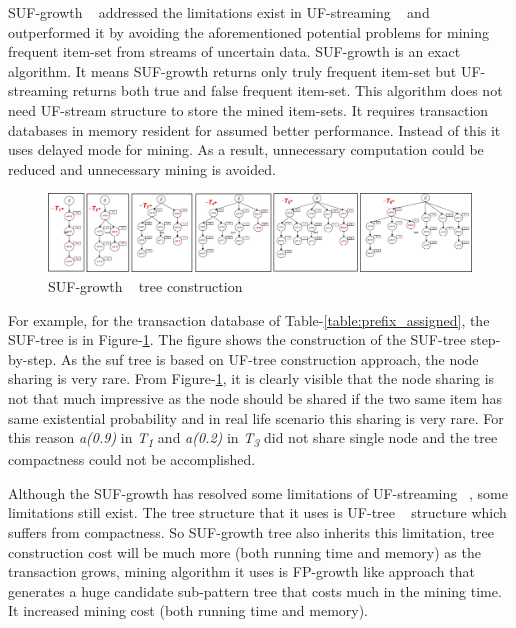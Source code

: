 \documentclass[conference]{IEEEtran}
\begin{document}
SUF-growth ~\cite{DBLP:conf/icde/LeungH09} addressed the limitations exist in UF-streaming ~\cite{DBLP:conf/icde/LeungH09} and outperformed it by avoiding the aforementioned potential problems for mining frequent item-set from streams of uncertain data. SUF-growth is an exact algorithm. It means SUF-growth returns only truly frequent item-set but UF-streaming returns both true and false frequent item-set. This algorithm does not need UF-stream structure to store the mined item-sets. It requires transaction databases in memory resident for assumed better performance. Instead of this it uses delayed mode for mining. As a result, unnecessary computation could be reduced and unnecessary mining is avoided.

        \begin{figure}[tb]
        \centering
            \includegraphics[width=\textwidth]{visio/SUF}
        \caption{SUF-growth ~\cite{DBLP:conf/icde/LeungH09} tree construction}%
        \label{figure:suf_simulation}
        \end{figure}

For example, for the transaction database of Table-\ref{table:prefix_assigned}, the SUF-tree is in Figure-\ref{figure:suf_simulation}. The figure shows the construction of the SUF-tree step-by-step. As the suf tree is based on UF-tree construction approach, the node sharing is very rare. From Figure-\ref{figure:suf_simulation}, it is clearly visible that the node sharing is not that much impressive as the node should be shared if the two same item has same existential probability and in real life scenario this sharing is very rare. For this reason \emph{a(0.9)} in \emph{T\textsubscript{1}} and \emph{a(0.2)} in \emph{T\textsubscript{3}} did not share single node and the tree compactness could not be accomplished. 

Although the SUF-growth has resolved some limitations of UF-streaming ~\cite{DBLP:conf/icde/LeungH09}, some limitations still exist. The tree structure that it uses is UF-tree ~\cite{DBLP:conf/kdd/GadeWK04} structure which suffers from compactness. So SUF-growth tree also inherits this limitation, tree construction cost will be much more (both running time and memory) as the transaction grows, mining algorithm it uses is FP-growth like approach that generates a huge candidate sub-pattern tree that costs much in the mining time. It increased mining cost (both running time and memory).
\end{document}
